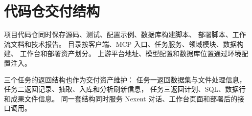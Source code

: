 \section{代码仓交付结构}

项目代码仓同时保存源码、测试、配置示例、数据库构建脚本、
部署脚本、工作流文档和技术报告。
目录按客户端、MCP 入口、任务服务、领域模块、数据构建、
工作台和部署资产划分。
上游平台地址、模型配置和数据库位置通过环境配置注入。

三个任务的返回结构也作为交付资产维护：
任务一返回数据集与文件处理信息，
任务二返回记录、抽取、入库和分析刷新信息，
任务三返回计划、SQL、数据行和成果文件信息。
同一套结构同时服务 Nexent 对话、工作台页面和部署后的接口调用。
